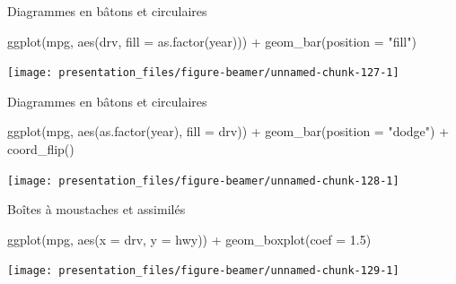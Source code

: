 \documentclass[12pt,handout,ignorenonframetext,]{beamer}
\newenvironment{Shaded}{}{}
\newcommand{\KeywordTok}[1]{\textcolor[rgb]{0.00,0.00,1.00}{{#1}}}
\newcommand{\DataTypeTok}[1]{{#1}}
\newcommand{\FloatTok}[1]{{#1}}
\newcommand{\StringTok}[1]{\textcolor[rgb]{0.00,0.50,0.50}{{#1}}}
\newcommand{\NormalTok}[1]{{#1}}
\renewenvironment{Shaded}{\begin{snugshade}}{\end{snugshade}}
\begin{document}
\begin{frame}[fragile]{Diagrammes en bâtons et circulaires}

\footnotesize \center

\begin{Shaded}
\begin{Highlighting}[]
\KeywordTok{ggplot}\NormalTok{(mpg, }\KeywordTok{aes}\NormalTok{(drv, }\DataTypeTok{fill =} \KeywordTok{as.factor}\NormalTok{(year))) +}\StringTok{ }
\StringTok{  }\KeywordTok{geom_bar}\NormalTok{(}\DataTypeTok{position =} \StringTok{"fill"}\NormalTok{)}
\end{Highlighting}
\end{Shaded}

\texttt{[image: presentation\_files/figure-beamer/unnamed-chunk-127-1]}

\end{frame}

\begin{frame}[fragile]{Diagrammes en bâtons et circulaires}

\footnotesize \center

\begin{Shaded}
\begin{Highlighting}[]
\KeywordTok{ggplot}\NormalTok{(mpg, }\KeywordTok{aes}\NormalTok{(}\KeywordTok{as.factor}\NormalTok{(year), }\DataTypeTok{fill =} \NormalTok{drv)) +}\StringTok{ }
\StringTok{  }\KeywordTok{geom_bar}\NormalTok{(}\DataTypeTok{position =} \StringTok{"dodge"}\NormalTok{) +}\StringTok{ }
\StringTok{  }\KeywordTok{coord_flip}\NormalTok{()}
\end{Highlighting}
\end{Shaded}

\texttt{[image: presentation\_files/figure-beamer/unnamed-chunk-128-1]}

\end{frame}

\begin{frame}[fragile]{Boîtes à moustaches et assimilés}

\footnotesize \center

\begin{Shaded}
\begin{Highlighting}[]
\KeywordTok{ggplot}\NormalTok{(mpg, }\KeywordTok{aes}\NormalTok{(}\DataTypeTok{x =} \NormalTok{drv, }\DataTypeTok{y =} \NormalTok{hwy)) +}\StringTok{ }
\StringTok{  }\KeywordTok{geom_boxplot}\NormalTok{(}\DataTypeTok{coef =} \FloatTok{1.5}\NormalTok{)}
\end{Highlighting}
\end{Shaded}

\texttt{[image: presentation\_files/figure-beamer/unnamed-chunk-129-1]}

\end{frame}
\end{document}
